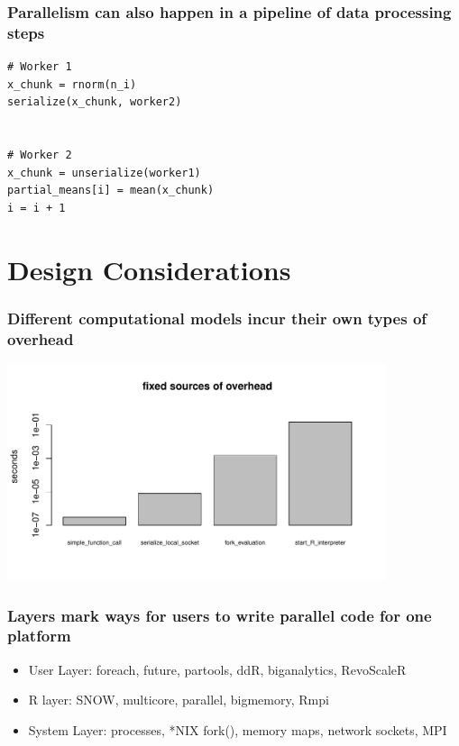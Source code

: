 \documentclass{beamer}
\begin{document}
\begin{frame}[fragile]

    \frametitle{Parallelism can also happen in a pipeline of data
    processing steps}

\begin{verbatim}
# Worker 1
x_chunk = rnorm(n_i)
serialize(x_chunk, worker2)


# Worker 2
x_chunk = unserialize(worker1)
partial_means[i] = mean(x_chunk)
i = i + 1
\end{verbatim}

\end{frame}
\section{Design Considerations}
\begin{frame}

\frametitle{Different computational models incur their own types of overhead}

    \centerline{\includegraphics[height=2.5in]{../compute_times/overhead}}


\end{frame}
\begin{frame}

    \frametitle{Layers mark ways for users to write parallel code for one
    platform}

\begin{itemize}
\item User Layer: foreach, future, partools, ddR, biganalytics, RevoScaleR
\item R layer: SNOW, multicore, parallel, bigmemory, Rmpi
\item System Layer: processes, *NIX fork(), memory maps, network sockets,
    MPI
\end{itemize}

\end{frame}
\end{document}
